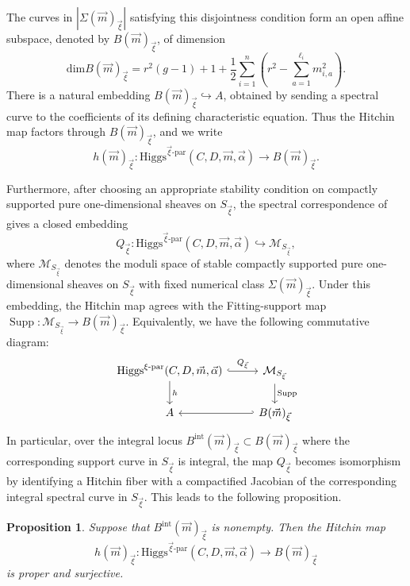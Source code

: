\documentclass[11pt]{amsart}
\theoremstyle{plain}
\newtheorem{proposition}[theorem]{Proposition}
\theoremstyle{definition}
\theoremstyle{remark}
\newcommand{\cM}{\mathcal M}
\newcommand{\Higgs}{\mathrm{Higgs}}
\def\dim{\mathrm{dim}}
\def\vxi{\vec{\xi}}
\def\vm{\vec{m}}
\def\bmxi{B(\vm)_{\vxi}}
\begin{document}
The curves in $|\Sigma(\vec m)_{\vec\xi}|$ satisfying this disjointness condition form an open affine subspace, denoted by $B(\vec m)_{\vec\xi}$, of dimension 
\begin{equation}\label{eq:dim bmxi}
    \dim \bmxi
	=
	r^2(g-1)+1+\frac{1}{2}\sum_{i=1}^n\left(r^2-\sum_{a=1}^{\ell_i}m_{i,a}^2\right).
\end{equation}
There is a natural embedding $B(\vec m)_{\vec\xi}\hookrightarrow A$, obtained by sending a spectral curve to the coefficients of its defining characteristic equation. Thus the Hitchin map factors through $B(\vec m)_{\vec\xi}$, and we write
\begin{equation}\label{eq:Hit xi-par}
h(\vec m)_{\vxi}:\Higgs^{\vec\xi\text{-par}}(C,D,\vec m,\vec\alpha)\to B(\vec m)_{\vec\xi}.
\end{equation}

Furthermore, after choosing an appropriate stability condition on compactly supported pure one-dimensional sheaves on $S_{\vec\xi}$, the spectral correspondence of \cite[Section 4]{LeeLee2025} gives a closed embedding
\[
Q_{\vec\xi}:\Higgs^{\vec\xi\text{-par}}(C,D,\vec m,\vec\alpha)\hookrightarrow \mathcal M_{S_{\vec\xi}},
\]
where $\mathcal M_{S_{\vec\xi}}$ denotes the moduli space of stable compactly supported pure one-dimensional sheaves on $S_{\vec\xi}$ with fixed numerical class $\Sigma(\vec m)_{\vec\xi}$. Under this embedding, the Hitchin map agrees with the Fitting-support map $\operatorname{Supp}:\mathcal M_{S_{\vec\xi}}\to B(\vec m)_{\vec\xi}$. Equivalently, we have the following commutative diagram:
\begin{equation}\label{eq:diag sp}
	    \begin{tikzcd}
				\Higgs^{\xi\text{-par}}(C,D,\vec{m}, \vec{\alpha}) \arrow[r, hook, "Q_{\vec{\xi}}"] \arrow[d, "h"] & \cM_{S_{\vec{\xi}}}  \arrow[d, "\mathrm{Supp}"]\\
				A & B(\vec{m})_{\vec{\xi}} \arrow[l, hook']
			\end{tikzcd}
	\end{equation}
			In particular, over the integral locus $B^{\mathrm{int}}(\vec m)_{\vec\xi} \subset B(\vec m)_{\vec\xi}$ where the corresponding support curve in $S_{\vec{\xi}}$ is integral, the map $Q_{\vec\xi}$ becomes isomorphism by identifying a Hitchin fiber with a compactified Jacobian of the corresponding integral spectral curve in $S_{\vec\xi}$. This leads to the following proposition.

\begin{proposition}\label{prop:xi-par sm.irr}
	Suppose that $B^{\mathrm{int}}(\vec m)_{\vec\xi}$ is nonempty. Then the Hitchin map 
	\[
	h(\vec{m})_{\vxi}:\Higgs^{\vec\xi\text{-par}}(C,D,\vec m,\vec\alpha)\to B(\vec m)_{\vec\xi}
	\]
	is proper and surjective.
\end{proposition}
\end{document}
